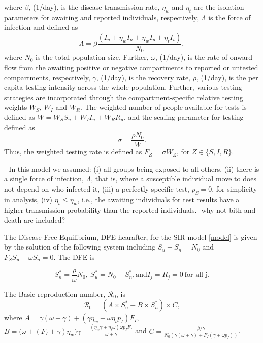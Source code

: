 \documentclass{article}
\newcommand{\Rnum}{\mathcal{R}_0}
\theoremstyle{definition} %
\begin{document}
where $\beta$, (1/day), is the disease transmission rate, $\eta_w$ and $\eta_t$ are the isolation parameters for awaiting and reported individuals, respectively, $\Lambda$ is the force of infection and defined as 
\begin{equation}
\label{Lambda}
\Lambda=\beta \frac{(I_u+\eta_w I_n+\eta_w I_p+ \eta_t I_t)}{N_0},
\end{equation}
where $N_0$ is the total population size. Further, $\omega$, (1/day), is the rate of onward flow from the awaiting positive or negative compartments to reported or untested compartments, respectively, $\gamma$, (1/day), is the recovery rate, $\rho$, (1/day), is the per capita testing intensity across the whole population. Further, various testing strategies are incorporated through the compartment-specific relative testing weights $W_S$, $W_I$ and $W_R$. The weighted number of people available for tests is defined as $W = W_S S_u + W_I I_u + W_R R_u$, and the scaling parameter for testing defined as \begin{equation}
\label{sigma}
\sigma = \frac{\rho N_0}{W}.
\end{equation}
Thus, the weighted testing rate is defined as $F_Z=\sigma W_Z$, for $Z \in \{S,I,R\}$. 

- In this model we assumed: (i) all groups being exposed to all others, (ii) there is a single force of infection, $\Lambda$, that is, where a susceptible individual move to does not depend on who infected it, (iii) a perfectly specific test, $p_S=0$, for simplicity in analysis, (iv)  $\eta_t \leq \eta_w$, i.e., the awaiting individuals for test results have a higher transmission probability than the reported individuals. 
-why not bith and death are included?


The Disease-Free Equilibrium, DFE hearafter, for the SIR model \ref{model} is given by the solution of the following system including $S_u+S_n=N_0$ and $F_S S_u-\omega S_n=0$. The DFE is

\begin{equation}
\label{dfe}
S_n^*= \frac{\rho}{\omega} N_0, \ S_u^*= N_0-S_n^*, \text{and} I_j=R_j=0 \ \text{for all j}.
\end{equation}

The Basic reproduction number, $\Rnum$, is 
\begin{equation}
\label{R0}
\Rnum= (A \times S_u^* + B \times S_n^*) \times C, 
\end{equation}
where
$A=\gamma(\omega+\gamma) + (\gamma \eta_w + \omega \eta_t p_I) F_I$,
$B=\big(\omega+(F_I+\gamma)\eta_w\big) \gamma+\frac{(\eta_w \gamma+ \eta_t\omega) \omega p_I F_I }{\omega+\gamma}$ and 
$C=\frac{\beta/\gamma}{N_0 (\gamma(\omega+\gamma)+F_I(\gamma+\omega p_I))}$.
\end{document}

